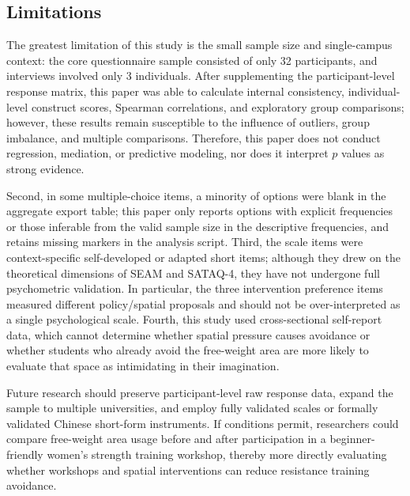 \subsection{Limitations}

The greatest limitation of this study is the small sample size and single-campus context: the core questionnaire sample consisted of only 32 participants, and interviews involved only 3 individuals.
After supplementing the participant-level response matrix, this paper was able to calculate internal consistency, individual-level construct scores, Spearman correlations, and exploratory group comparisons; however, these results remain susceptible to the influence of outliers, group imbalance, and multiple comparisons.
Therefore, this paper does not conduct regression, mediation, or predictive modeling, nor does it interpret $p$ values as strong evidence.

Second, in some multiple-choice items, a minority of options were blank in the aggregate export table; this paper only reports options with explicit frequencies or those inferable from the valid sample size in the descriptive frequencies, and retains missing markers in the analysis script.
Third, the scale items were context-specific self-developed or adapted short items; although they drew on the theoretical dimensions of SEAM and SATAQ-4, they have not undergone full psychometric validation.
In particular, the three intervention preference items measured different policy/spatial proposals and should not be over-interpreted as a single psychological scale.
Fourth, this study used cross-sectional self-report data, which cannot determine whether spatial pressure causes avoidance or whether students who already avoid the free-weight area are more likely to evaluate that space as intimidating in their imagination.

Future research should preserve participant-level raw response data, expand the sample to multiple universities, and employ fully validated scales or formally validated Chinese short-form instruments.
If conditions permit, researchers could compare free-weight area usage before and after participation in a beginner-friendly women's strength training workshop, thereby more directly evaluating whether workshops and spatial interventions can reduce resistance training avoidance.
